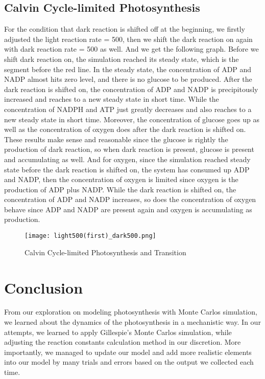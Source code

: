 \documentclass[12pt,reqno]{amsart}
\begin{document}
	\subsection*{Calvin Cycle-limited Photosynthesis} For the condition that dark reaction is shifted off at the beginning, we firstly adjusted the light reaction rate = 500, then we shift the dark reaction on again with dark reaction rate = 500 as well. And we get the following graph. Before we shift dark reaction on, the simulation reached its steady state, which is the segment before the red line. In the steady state, the concentration of ADP and NADP almost hits zero level, and there is no glucose to be produced. After the dark reaction is shifted on, the concentration of ADP and NADP is precipitously increased and reaches to a new steady state in short time. While the concentration of NADPH and ATP just greatly decreases and also reaches to a new steady state in short time. Moreover, the concentration of glucose goes up as well as the concentration of oxygen does after the dark reaction is shifted on. These results make sense and reasonable since the glucose is rightly the production of dark reaction, so when dark reaction is present, glucose is present and accumulating as well. And for oxygen, since the simulation reached steady state before the dark reaction is shifted on, the system has consumed up ADP and NADP, then the concentration of oxygen is limited since oxygen is the production of ADP plus NADP. While the dark reaction is shifted on, the concentration of ADP and NADP increases, so does the concentration of oxygen behave since ADP and NADP are present again and oxygen is accumulating as production.  
	
	
	
	\begin{figure}[h!]
        \caption{Calvin Cycle-limited Photosynthesis and Transition}
        \centering
        \texttt{[image: light500(first)\_dark500.png]}
        \label{climit}
    \end{figure}
	

	\section*{\large \textbf{Conclusion}}
	
	From our exploration on modeling photosynthesis with Monte Carlos 
	simulation, we learned about the dynamics of the photosynthesis in 
	a mechanistic way. In our attempts, we learned to apply Gillespie’s 
	Monte Carlos simulation, while adjusting the reaction constants 
	calculation method in our discretion. More importantly, we managed 
	to update our model and add more realistic elements into our model 
	by many trials and errors based on the output we collected each time. 
	
\end{document}
